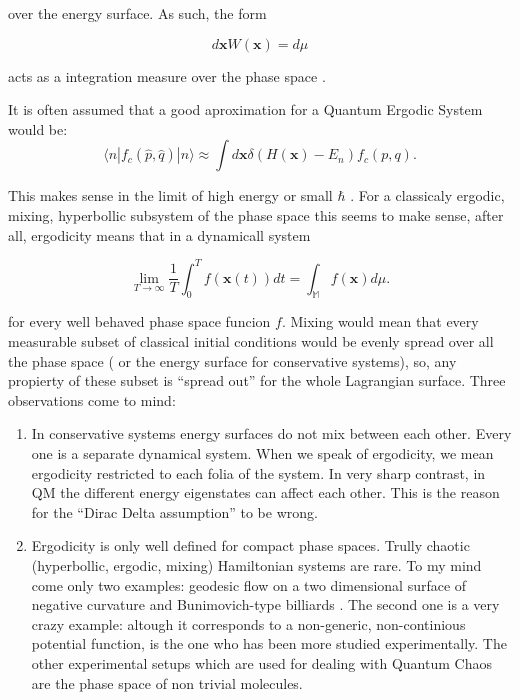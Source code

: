 \documentclass[a4paper,10pt]{article}
\newcommand{\xfase}{\mathbf{x}}
\newcommand{\Var}{\mathbb{M}}
\newcommand{\bra}[1]{\langle #1|}
\newcommand{\ket}[1]{|#1\rangle}
\begin{document}
over the energy surface. As such, the form

\begin{equation}
 d\xfase W(\xfase) = d \mu
\end{equation}

acts as a integration measure over the phase space \cite{Moyal49}.

It is often assumed that a good aproximation for
a Quantum Ergodic System would be:
\begin{equation}
  \bra{n}f_c(\hat{p},\hat{q}) \ket{n}\approx \int d\xfase 
\delta(H(\xfase)-E_n) f_c(p,q).
\end{equation}

This makes sense in the limit of high energy or small $\hbar$ 
\cite{Berry77}. For a classicaly ergodic, mixing, 
hyperbollic subsystem of the phase space this seems to make
sense, after all, ergodicity means that in a dynamicall system

\begin{equation}
 \lim_{T\rightarrow \infty} \frac{1}{T}\int_0^T f(\xfase(t)) dt =
 \int_\Var f(\xfase) d\mu.
\end{equation}

for every well behaved phase space funcion $f$. Mixing would mean
that every measurable subset of classical initial conditions would
be evenly spread over all the phase space ( or the energy surface
for conservative systems), so, any propierty of these subset is
``spread out'' for the whole Lagrangian surface. 
Three observations come to mind: 
\begin{enumerate}
\item In conservative systems energy surfaces do not mix between each other.
Every one is a separate dynamical system. When  we speak of ergodicity,
we mean ergodicity restricted to each folia of the system. 
In very sharp contrast, in QM the different energy eigenstates
can affect each other. This is the reason for the ``Dirac
Delta assumption'' to be wrong. 
\item Ergodicity is only well defined for compact phase spaces. 
Trully chaotic (hyperbollic, ergodic, mixing) Hamiltonian 
systems are rare.
To my mind come only two examples: geodesic flow on a two dimensional
surface of negative curvature \cite{Anosov} and 
Bunimovich-type billiards \cite{Bunim90}. The second
one is a very crazy example: altough it corresponds to a non-generic,
non-continious potential function, is the one who has been more
studied experimentally. The other experimental setups which are used
for dealing with
Quantum Chaos are the phase space of non trivial molecules.
 
\end{enumerate}
\end{document}
